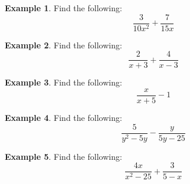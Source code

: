 \documentclass[addpoints,12pt]{exam}
\theoremstyle{definition}
\newtheorem{example}{Example}[subsection]
\begin{document}
\begin{example}
Find the following: \[\dfrac{3}{10x^2} + \dfrac{7}{15x}\]
\end{example}

\newpage

\begin{example}
Find the following: \[\dfrac{2}{x+3} + \dfrac{4}{x-3}\]
\vspace{1.75in}
\end{example}

\begin{example}
Find the following: \[\dfrac{x}{x+5} - 1\]
\vspace{1.75in}
\end{example}

\begin{example}
Find the following: \[\dfrac{5}{y^2-5y} - \dfrac{y}{5y-25}\]
\end{example}

\newpage

\begin{example}
Find the following: \[\dfrac{4x}{x^2-25} + \dfrac{3}{5-x}\]
\end{example}
\end{document}
